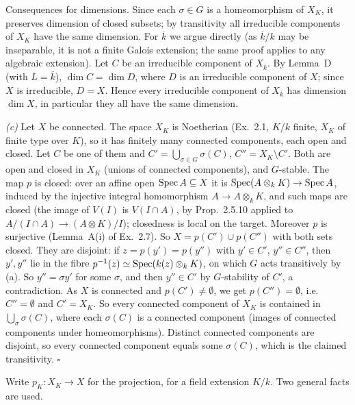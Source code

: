 \documentclass[11pt]{article}
\begin{document}
Consequences for dimensions. Since each $\sigma\in G$ is a homeomorphism of $X_K$, it preserves dimension of closed subsets; by transitivity all irreducible components of $X_K$ have the same dimension. For $\overline k$ we argue directly (as $\overline k/k$ may be inseparable, it is not a finite Galois extension; the same proof applies to any algebraic extension). Let $C$ be an irreducible component of $X_{\overline k}$. By Lemma~D (with $L=\overline k$), $\dim C=\dim D$, where $D$ is an irreducible component of $X$; since $X$ is irreducible, $D=X$. Hence every irreducible component of $X_{\overline k}$ has dimension $\dim X$, in particular they all have the same dimension.

\emph{(c)} Let $X$ be connected. The space $X_K$ is Noetherian (Ex.~2.1, $K/k$ finite, $X_K$ of finite type over $K$), so it has finitely many connected components, each open and closed. Let $C$ be one of them and $C'=\bigcup_{\sigma\in G}\sigma(C)$, $C''=X_K\setminus C'$. Both are open and closed in $X_K$ (unions of connected components), and $G$-stable. The map $p$ is closed: over an affine open $\operatorname{Spec} A\subseteq X$ it is $\operatorname{Spec}(A\otimes_kK)\to\operatorname{Spec} A$, induced by the injective integral homomorphism $A\to A\otimes_kK$, and such maps are closed (the image of $V(I)$ is $V(I\cap A)$, by Prop.~2.5.10 applied to $A/(I\cap A)\to(A\otimes K)/I$); closedness is local on the target. Moreover $p$ is surjective (Lemma~A(i) of Ex.~2.7). So $X=p(C')\cup p(C'')$ with both sets closed. They are disjoint: if $z=p(y')=p(y'')$ with $y'\in C'$, $y''\in C''$, then $y',y''$ lie in the fibre $p^{-1}(z)\simeq\operatorname{Spec}(k(z)\otimes_kK)$, on which $G$ acts transitively by (a). So $y''=\sigma y'$ for some $\sigma$, and then $y''\in C'$ by $G$-stability of $C'$, a contradiction. As $X$ is connected and $p(C')\ne\emptyset$, we get $p(C'')=\emptyset$, i.e.\ $C''=\emptyset$ and $C'=X_K$. So every connected component of $X_K$ is contained in $\bigcup_\sigma\sigma(C)$, where each $\sigma(C)$ is a connected component (images of connected components under homeomorphisms). Distinct connected components are disjoint, so every connected component equals some $\sigma(C)$, which is the claimed transitivity. \hfill$\square$

\pf
Write $p_K:X_K\to X$ for the projection, for a field extension $K/k$. Two general facts are used.
\end{document}
